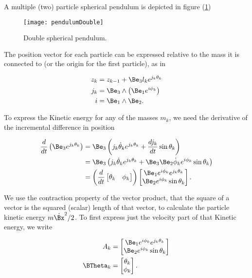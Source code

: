 A multiple (two) particle spherical pendulum is depicted in figure (\ref{fig:sPolarArxiv:pendulumDouble})

\begin{figure}[htp]
\centering
\texttt{[image: pendulumDouble]}
\caption{Double spherical pendulum.}\label{fig:sPolarArxiv:pendulumDouble}
\end{figure}

The position vector for each particle can be expressed relative to the mass it is connected to (or the origin for the first particle), as in

\begin{align}\label{eqn:sPolarArxiv:boo1}
z_k &= z_{k-1} + \Be_3 l_k e^{j_k \theta_k} \\
j_k &= \Be_3 \wedge \left( \Be_1 e^{i \phi_k} \right) \\
i &= \Be_1 \wedge \Be_2.
\end{align}

To express the Kinetic energy for any of the masses $m_k$, we need the derivative of the incremental difference in position

\begin{align*}
\frac{d}{dt} \left( \Be_3 e^{j_k \theta_k} \right)
&=
\Be_3 \left( j_k \dot{\theta}_k e^{j_k \theta_k} + \frac{d j_k }{dt} \sin\theta_k \right)  \\
&=
\Be_3 \left( j_k \dot{\theta}_k e^{j_k \theta_k} + \Be_3 \Be_2 \dot{\phi}_k e^{i \phi_k} \sin\theta_k \right)  \\
&=
\left( \frac{d}{dt}
\begin{bmatrix}
\theta_k & \phi_k
\end{bmatrix} \right)
\begin{bmatrix}
\Be_1 e^{i \phi_k} e^{j_k \theta_k} \\
\Be_2 e^{i \phi_k} \sin\theta_k
\end{bmatrix}.
\end{align*}

We use the contraction property of the vector product, that the square of a vector is the squared (scalar) length of that vector, to calculate the particle kinetic energy $m \dot{\Bx}^2/2$.  To first express just the velocity part of that Kinetic energy, we write

\begin{align}\label{eqn:sPolarArxiv:boo2}
A_k &=
\begin{bmatrix}
\Be_1 e^{i \phi_k} e^{j_k \theta_k} \\
\Be_2 e^{i \phi_k} \sin\theta_k
\end{bmatrix} \\
\BTheta_k &=
\begin{bmatrix}
\theta_k \\
\phi_k
\end{bmatrix}.
\end{align}

